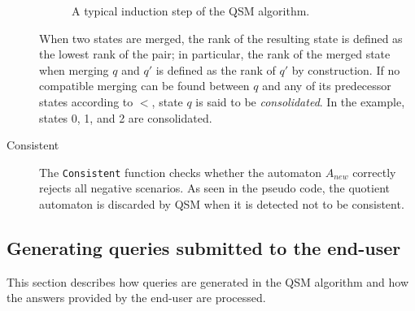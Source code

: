 \begin{description}
\begin{figure}
\hspace*{-1cm}
\begin{center}
\end{center}
\caption{A typical induction step of the \textsc{QSM} algorithm\label{Fig:algo:steps}.}
\end{figure}

When two states are merged, the rank of the resulting state is defined as the lowest rank of the pair; in particular, the rank of the merged state when merging $q$ and $q'$ is defined as the rank of $q'$ by construction. If no compatible merging can be found between $q$ and any of its predecessor states according to $<$, state $q$ is said to be \textsl{consolidated}. In the example, states 0, 1, and 2 are consolidated.

\item[Consistent] The \texttt{Consistent} function checks whether the automaton $A_{new}$ correctly rejects all negative scenarios. As seen in the pseudo code, the quotient automaton is discarded by \textsc{QSM} when it is detected not to be consistent.

\end{description}

\subsection{Generating queries submitted to the end-user\label{QSM:query}}

This section describes how queries are generated in the \textsc{QSM} algorithm and how the answers provided by the end-user are processed.

